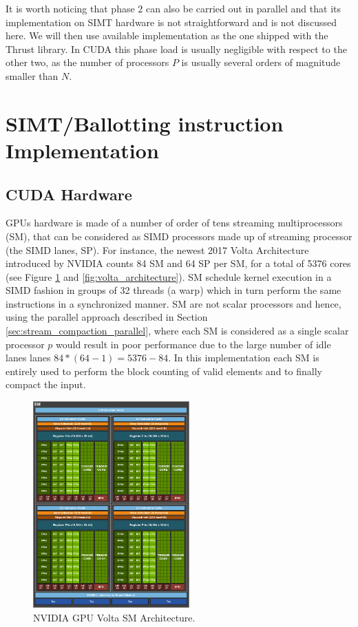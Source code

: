 It is worth noticing that phase $2$ can also be carried out in parallel and that its implementation on SIMT hardware is not straightforward and is not discussed here. We will then use available implementation as the one shipped with the Thrust library. In CUDA this phase load is usually negligible with respect to the other two, as the number of processors $P$ is usually several orders of magnitude smaller than $N$.

\section{SIMT/Ballotting instruction Implementation}
\subsection{CUDA Hardware}
GPUs hardware is made of a number of order of tens streaming multiprocessors (SM), that can be considered as SIMD processors made up of streaming processor (the SIMD lanes, SP). For instance, the newest 2017 Volta Architecture introduced by NVIDIA counts 84 SM and 64 SP per SM, for a total of 5376 cores (see Figure \ref{fig:volta_sm} and \ref{fig:volta_architecture}).
SM schedule kernel execution in a SIMD fashion in groups of 32 threads (a warp) which in turn perform the same instructions in a synchronized manner. SM are not scalar processors and hence, using the parallel approach described in Section \ref{sec:stream_compaction_parallel}, where each SM is considered as a single scalar processor \(p\) would result in poor performance due to the large number of idle lanes lanes \( 84*(64-1)=5376-84\).
In this implementation each SM is entirely used to perform the block counting of valid elements and to finally compact the input.
\begin{figure}
	\begin{center}
		\includegraphics[width=6cm]{./images/stream_compaction/volta_sm}
		\caption{NVIDIA GPU Volta SM Architecture.}
		\label{fig:volta_sm}
	\end{center}
\end{figure}

